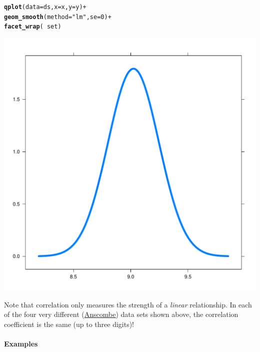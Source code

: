 \documentclass[10pt]{article}\usepackage[]{graphicx}\usepackage[]{color}
\makeatletter
\def\maxwidth{ %
  \ifdim\Gin@nat@width>\linewidth
    \linewidth
  \else
    \Gin@nat@width
  \fi
}
\newcommand{\hlnum}[1]{\textcolor[rgb]{0.686,0.059,0.569}{#1}}%
\newcommand{\hlstr}[1]{\textcolor[rgb]{0.192,0.494,0.8}{#1}}%
\newcommand{\hlopt}[1]{\textcolor[rgb]{0,0,0}{#1}}%
\newcommand{\hlstd}[1]{\textcolor[rgb]{0.345,0.345,0.345}{#1}}%
\newcommand{\hlkwc}[1]{\textcolor[rgb]{0.333,0.667,0.333}{#1}}%
\newcommand{\hlkwd}[1]{\textcolor[rgb]{0.737,0.353,0.396}{\textbf{#1}}}%
\newenvironment{kframe}{%
 \def\at@end@of@kframe{}%
 \ifinner\ifhmode%
  \def\at@end@of@kframe{\end{minipage}}%
  \begin{minipage}{\columnwidth}%
 \fi\fi%
 \def\FrameCommand##1{\hskip\@totalleftmargin \hskip-\fboxsep
 \colorbox{shadecolor}{##1}\hskip-\fboxsep
     \hskip-\linewidth \hskip-\@totalleftmargin \hskip\columnwidth}%
 \MakeFramed {\advance\hsize-\width
   \@totalleftmargin\z@ \linewidth\hsize
   \@setminipage}}%
 {\par\unskip\endMakeFramed%
 \at@end@of@kframe}
\newenvironment{knitrout}{}{} %
\makeatother
\begin{document}
\begin{knitrout}
\color{fgcolor}\begin{kframe}
\begin{alltt}
\hlkwd{qplot}\hlstd{(}\hlkwc{data} \hlstd{= ds,} \hlkwc{x} \hlstd{= x,} \hlkwc{y} \hlstd{= y)} \hlopt{+}
  \hlkwd{geom_smooth}\hlstd{(}\hlkwc{method} \hlstd{=} \hlstr{"lm"}\hlstd{,} \hlkwc{se} \hlstd{=} \hlnum{0}\hlstd{)} \hlopt{+}
  \hlkwd{facet_wrap}\hlstd{(}\hlopt{~}\hlstd{set)}
\end{alltt}
\end{kframe}
\includegraphics[width=\maxwidth]{figure/unnamed-chunk-3-1} 

\end{knitrout}





Note that correlation only measures the strength of a \emph{linear} relationship. In each of the four very different (\href{http://en.wikipedia.org/wiki/Anscombe%27s_quartet}{Anscombe}) data sets shown above, the correlation coefficient is the same (up to three digits)!

\paragraph{Examples}
\end{document}
